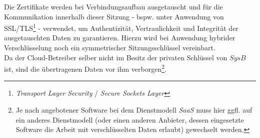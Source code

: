 \noindent
Die Zertifikate werden bei Verbindungsaufbau ausgetauscht und für die Kommunikation innerhalb dieser Sitzung - bspw. unter Anwendung von SSL/TLS\footnote{
\textit{Transport Layer Security} / \textit{Secure Sockets Layer}
} - verwendet, um Authentizität, Vertraulichkeit und Integrität der ausgetauschten Daten zu garantieren.
Hierzu wird bei Anwendung hybrider Verschlüsselung noch ein symmetrischer Sitzungsschlüssel vereinbart.\\
Da der Cloud-Betreiber selber nicht im Besitz der privaten Schlüssel von $SysB$ ist, sind die übertragenen Daten vor ihm verborgen\footnote{
Je nach angebotener Software bei dem Dienstmodell \textit{SaaS} muss hier ggfl. auf ein anderes Dienstmodell (oder einen anderen Anbieter, dessen eingesetzte Software die Arbeit mit verschlüsselten Daten erlaubt) gewechselt werden.
}.